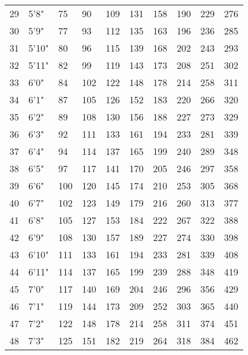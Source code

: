 \documentclass{article}
\begin{document}
\begin{longtable}{@{} l l l l l l l l l l}
29 & 5'8" & 75 & 90 & 109 & 131 & 158 & 190 & 229 & 276\\
30 & 5'9" & 77 & 93 & 112 & 135 & 163 & 196 & 236 & 285\\
31 & 5'10" & 80 & 96 & 115 & 139 & 168 & 202 & 243 & 293\\
32 & 5'11" & 82 & 99 & 119 & 143 & 173 & 208 & 251 & 302\\
33 & 6'0" & 84 & 102 & 122 & 148 & 178 & 214 & 258 & 311\\
34 & 6'1" & 87 & 105 & 126 & 152 & 183 & 220 & 266 & 320\\
35 & 6'2" & 89 & 108 & 130 & 156 & 188 & 227 & 273 & 329\\
36 & 6'3" & 92 & 111 & 133 & 161 & 194 & 233 & 281 & 339\\
37 & 6'4" & 94 & 114 & 137 & 165 & 199 & 240 & 289 & 348\\
38 & 6'5" & 97 & 117 & 141 & 170 & 205 & 246 & 297 & 358\\
39 & 6'6" & 100 & 120 & 145 & 174 & 210 & 253 & 305 & 368\\
40 & 6'7" & 102 & 123 & 149 & 179 & 216 & 260 & 313 & 377\\
41 & 6'8" & 105 & 127 & 153 & 184 & 222 & 267 & 322 & 388\\
42 & 6'9" & 108 & 130 & 157 & 189 & 227 & 274 & 330 & 398\\
43 & 6'10" & 111 & 133 & 161 & 194 & 233 & 281 & 339 & 408\\
44 & 6'11" & 114 & 137 & 165 & 199 & 239 & 288 & 348 & 419\\
45 & 7'0" & 117 & 140 & 169 & 204 & 246 & 296 & 356 & 429\\
46 & 7'1" & 119 & 144 & 173 & 209 & 252 & 303 & 365 & 440\\
47 & 7'2" & 122 & 148 & 178 & 214 & 258 & 311 & 374 & 451\\
48 & 7'3" & 125 & 151 & 182 & 219 & 264 & 318 & 384 & 462\\
\end{longtable}
\end{document}
